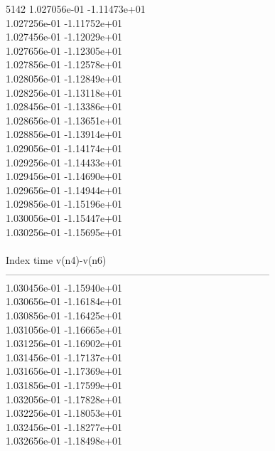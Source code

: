 5142	1.027056e-01	-1.11473e+01	\\ 	1.027256e-01	-1.11752e+01	\\ 	1.027456e-01	-1.12029e+01	\\ 	1.027656e-01	-1.12305e+01	\\ 	1.027856e-01	-1.12578e+01	\\ 	1.028056e-01	-1.12849e+01	\\ 	1.028256e-01	-1.13118e+01	\\ 	1.028456e-01	-1.13386e+01	\\ 	1.028656e-01	-1.13651e+01	\\ 	1.028856e-01	-1.13914e+01	\\ 	1.029056e-01	-1.14174e+01	\\ 	1.029256e-01	-1.14433e+01	\\ 	1.029456e-01	-1.14690e+01	\\ 	1.029656e-01	-1.14944e+01	\\ 	1.029856e-01	-1.15196e+01	\\ 	1.030056e-01	-1.15447e+01	\\ 	1.030256e-01	-1.15695e+01	\\ \hline
\\ \hline
Index   time            v(n4)-v(n6)     \\ \hline
--------------------------------------------------------------------------------\\ 	1.030456e-01	-1.15940e+01	\\ 	1.030656e-01	-1.16184e+01	\\ 	1.030856e-01	-1.16425e+01	\\ 	1.031056e-01	-1.16665e+01	\\ 	1.031256e-01	-1.16902e+01	\\ 	1.031456e-01	-1.17137e+01	\\ 	1.031656e-01	-1.17369e+01	\\ 	1.031856e-01	-1.17599e+01	\\ 	1.032056e-01	-1.17828e+01	\\ 	1.032256e-01	-1.18053e+01	\\ 	1.032456e-01	-1.18277e+01	\\ 	1.032656e-01	-1.18498e+01	\\ \hline
